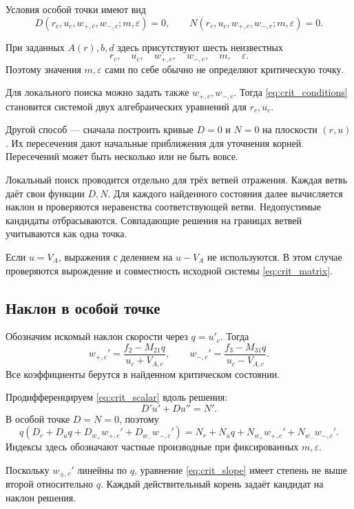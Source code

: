 \documentclass[12pt,a4paper]{article}
\begin{document}
Условия особой точки имеют вид
\begin{equation}
D(r_c,u_c,w_{+,c},w_{-,c};m,\varepsilon)=0,
\qquad
N(r_c,u_c,w_{+,c},w_{-,c};m,\varepsilon)=0.
\label{eq:crit_conditions}
\end{equation}

При заданных $A(r),b,d$ здесь присутствуют
шесть неизвестных
\[
r_c,\quad u_c,\quad w_{+,c},\quad w_{-,c},
\quad m,\quad\varepsilon.
\]
Поэтому значения $m,\varepsilon$ сами по себе
обычно не определяют критическую точку.

Для локального поиска можно задать также
$w_{+,c},w_{-,c}$.
Тогда \eqref{eq:crit_conditions} становится системой
двух алгебраических уравнений для $r_c,u_c$.

Другой способ --- сначала построить кривые
$D=0$ и $N=0$ на плоскости $(r,u)$.
Их пересечения дают начальные приближения
для уточнения корней.
Пересечений может быть несколько или не быть вовсе.

Локальный поиск проводится отдельно для трёх
ветвей отражения.
Каждая ветвь даёт свои функции $D,N$.
Для каждого найденного состояния далее вычисляется
наклон и проверяются неравенства соответствующей
ветви. Недопустимые кандидаты отбрасываются.
Совпадающие решения на границах ветвей учитываются
как одна точка.

Если $u=V_A$, выражения с делением на $u-V_A$
не используются. В этом случае проверяются
вырождение и совместность исходной системы
\eqref{eq:crit_matrix}.

\subsection{Наклон в особой точке}

Обозначим искомый наклон скорости через $q=u'_c$.
Тогда
\[
w_{+,c}'=\frac{f_2-M_{21}q}{u_c+V_{A,c}},
\qquad
w_{-,c}'=\frac{f_3-M_{31}q}{u_c-V_{A,c}}.
\]
Все коэффициенты берутся в найденном
критическом состоянии.

Продифференцируем \eqref{eq:crit_scalar}
вдоль решения:
\[
D'u'+Du''=N'.
\]
В особой точке $D=N=0$, поэтому
\begin{equation}
q\left(
D_r+D_uq+D_{w_+}w_{+,c}'+D_{w_-}w_{-,c}'
\right)
=
N_r+N_uq+N_{w_+}w_{+,c}'+N_{w_-}w_{-,c}'.
\label{eq:crit_slope}
\end{equation}
Индексы здесь обозначают частные производные
при фиксированных $m,\varepsilon$.

Поскольку $w_{\pm,c}'$ линейны по $q$,
уравнение \eqref{eq:crit_slope} имеет степень
не выше второй относительно $q$.
Каждый действительный корень задаёт кандидат
на наклон решения.
\end{document}
